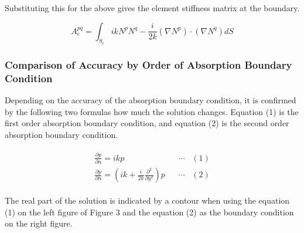 Substituting this for the above gives the element stiffness matrix at the boundary.

\begin{equation}
A^{pq}_e = \int_{S_e} ik N^p N^q -\frac{i}{2k}(\nabla N^p)\cdot(\nabla N^q) dS
\end{equation}

\subsubsection{Comparison of Accuracy by Order of Absorption Boundary Condition}
Depending on the accuracy of the absorption boundary condition, it is confirmed by the following two formulas how much the solution changes. Equation (1) is the first order absorption boundary condition, and equation (2) is the second order absorption boundary condition.

\begin{eqnarray}
\begin{array}{ll}\frac{\partial p}{\partial n} = ikp & \;\;\;\cdots\;\;\; (1)\\  \frac{\partial p}{\partial n} = \left(ik+\frac{i}{2k}\frac{\partial^2 }{\partial y^2}\right)p & \;\;\;\cdots\;\;\; (2)\end{array}
\end{eqnarray}

The real part of the solution is indicated by a contour when using the equation (1) on the left figure of Figure 3 and the equation (2) as the boundary condition on the right figure.


